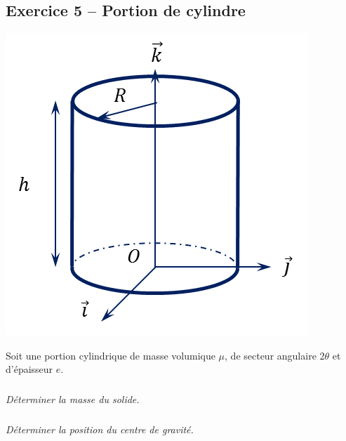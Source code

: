 \documentclass[10pt]{article}
\begin{document}
\subsection*{Exercice 5 -- Portion de cylindre}
\setcounter{subparagraph}{0}
\begin{minipage}[c]{.35\linewidth}
\begin{center}
\includegraphics[width=\textwidth]{images/cylindre}
\end{center}
\end{minipage} \hfill
\begin{minipage}[c]{.65\linewidth}
Soit une portion cylindrique de masse volumique $\mu$, de secteur angulaire 2$\theta$ et d'épaisseur $e$. 
\subparagraph{}
\textit{Déterminer la masse du solide.}
\subparagraph{}
\textit{Déterminer la position du centre de gravité.}
\end{minipage}
\end{document}
